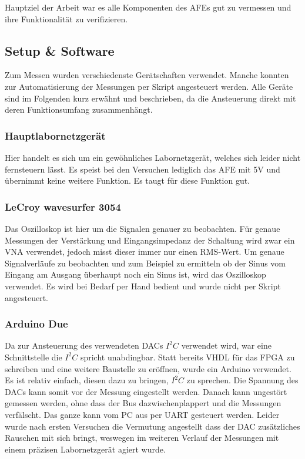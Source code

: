 Hauptziel der Arbeit war es alle Komponenten des AFEs gut zu vermessen und ihre Funktionalität zu verifizieren.

\subsection{Setup \& Software}
Zum Messen wurden verschiedenste Gerätschaften verwendet. Manche konnten zur Automatisierung der Messungen per Skript angesteuert werden. Alle Geräte sind im Folgenden kurz erwähnt und beschrieben, da die Ansteuerung direkt mit deren Funktionsumfang zusammenhängt.

\subsubsection*{Hauptlabornetzgerät}
Hier handelt es sich um ein gewöhnliches Labornetzgerät, welches sich leider nicht fernsteuern lässt. Es speist bei den Versuchen lediglich das AFE mit 5V und übernimmt keine weitere Funktion. Es taugt für diese Funktion gut.

\subsubsection*{LeCroy wavesurfer 3054}
Das Oszilloskop ist hier um die Signalen genauer zu beobachten. Für genaue Messungen der Verstärkung und Eingangsimpedanz der Schaltung wird zwar ein VNA verwendet, jedoch misst dieser immer nur einen RMS-Wert. Um genaue Signalverläufe zu beobachten und zum Beispiel zu ermitteln ob der Sinus vom Eingang am Ausgang überhaupt noch ein Sinus ist, wird das Oszilloskop verwendet. Es wird bei Bedarf per Hand bedient und wurde nicht per Skript angesteuert.

\subsubsection*{Arduino Due}
Da zur Ansteuerung des verwendeten DACs $I^2C$ verwendet wird, war eine Schnittstelle die $I^2C$ spricht unabdingbar. Statt bereits VHDL für das FPGA zu schreiben und eine weitere Baustelle zu eröffnen, wurde ein Arduino verwendet. Es ist relativ einfach, diesen dazu zu bringen, $I^2C$ zu sprechen. Die Spannung des DACs kann somit vor der Messung eingestellt werden. Danach kann ungestört gemessen werden, ohne dass der Bus dazwischenplappert und die Messungen verfälscht. Das ganze kann vom PC aus per UART gesteuert werden.
Leider wurde nach ersten Versuchen die Vermutung angestellt dass der DAC zusätzliches Rauschen mit sich bringt, weswegen im weiteren Verlauf der Messungen mit einem präzisen Labornetzgerät agiert wurde.

